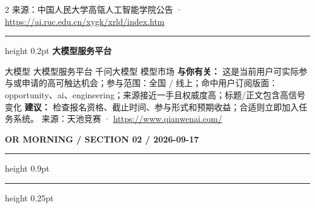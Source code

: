 \documentclass[10.5pt]{ctexart}
\begin{document}
\begin{multicols}{2}
{\footnotesize\color{ormuted} 来源：中国人民大学高瓴人工智能学院公告 · \url{https://ai.ruc.edu.cn/xygk/xrld/index.htm}}
\vspace{2mm}
\hrule height 0.2pt
\vspace{2mm}
{\large\bfseries 大模型服务平台}\par
大模型 大模型服务平台 千问大模型 模型市场
\textbf{与你有关：} 这是当前用户可实际参与或申请的高可触达机会；参与范围：全国 / 线上；命中用户订阅版面：opportunity、ai、engineering；来源接近一手且权威度高；标题/正文包含高信号变化
\textbf{建议：} 检查报名资格、截止时间、参与形式和预期收益；合适则立即加入任务系统。
{\footnotesize\color{ormuted} 来源：天池竞赛 · \url{https://www.qianwenai.com/}}
\end{multicols}
\newpage
{\small\bfseries OR MORNING / SECTION 02 / 2026-09-17}
\vspace{2mm}
\hrule height 0.9pt
\vspace{1.5mm}
\hrule height 0.25pt
\vspace{4mm}
\end{document}
